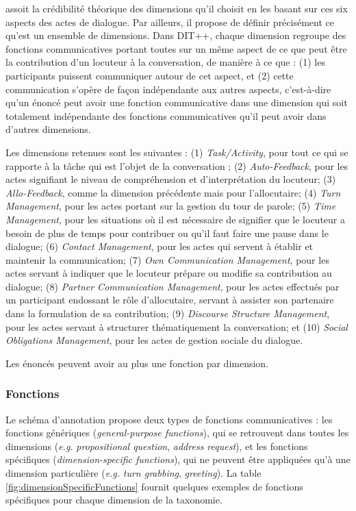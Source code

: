 \documentclass[10pt,a4paper,twoside]{article}
\begin{document}
\citeauthor{bunt2009dit++} assoit la crédibilité théorique des dimensions qu'il choisit en les basant sur ces six aspects des actes de dialogue. Par ailleurs, il propose de définir précisément ce qu'est un ensemble de dimensions. Dans DIT++, chaque dimension regroupe des fonctions communicatives portant toutes sur un même aspect de ce que peut être la contribution d'un locuteur à la conversation, de manière à ce que : (1) les participants puissent communiquer autour de cet aspect, et (2) cette communication s'opère de façon indépendante aux autres aspects, c'est-à-dire qu'un énoncé peut avoir une fonction communicative dans une dimension qui soit totalement indépendante des fonctions communicatives qu'il peut avoir dans d'autres dimensions.

Les dimensions retenues sont les suivantes : (1) \textit{Task/Activity}, pour tout ce qui se rapporte à la tâche qui est l'objet de la conversation ; (2) \textit{Auto-Feedback}, pour les actes signifiant le niveau de compréhension et d'interprétation du locuteur; (3) \textit{Allo-Feedback}, comme la dimension précédente mais pour l'allocutaire; (4) \textit{Turn Management}, pour les actes portant sur la gestion du tour de parole; (5) \textit{Time Management}, pour les situations où il est nécessaire de signifier que le locuteur a besoin de plus de temps pour contribuer ou qu'il faut faire une pause dans le dialogue; (6) \textit{Contact Management}, pour les actes qui servent à établir et maintenir la communication; (7) \textit{Own Communication Management}, pour les actes servant à indiquer que le locuteur prépare ou modifie sa contribution au dialogue; (8) \textit{Partner Communication Management}, pour les actes effectués par un participant endossant le rôle d'allocutaire, servant à assister son partenaire dans la formulation de sa contribution; (9) \textit{Discourse Structure Management}, pour les actes servant à structurer thématiquement la conversation; et (10) \textit{Social Obligations Management}, pour les actes de gestion sociale du dialogue.

Les énoncés peuvent avoir au plus une fonction par dimension.

\subsubsection{Fonctions}

Le schéma d'annotation propose deux types de fonctions communicatives : les fonctions génériques (\textit{general-purpose functions}), qui se retrouvent dans toutes les dimensions (\textit{e.g.} \textit{propositional question}, \textit{address request}), et les fonctions spécifiques (\textit{dimension-specific functions}), qui ne peuvent être appliquées qu'à une dimension particulière (\textit{e.g.} \textit{turn grabbing}, \textit{greeting}). La table \ref{fig:dimensionSpecificFunctions} fournit quelques exemples de fonctions spécifiques pour chaque dimension de la taxonomie.
\end{document}
